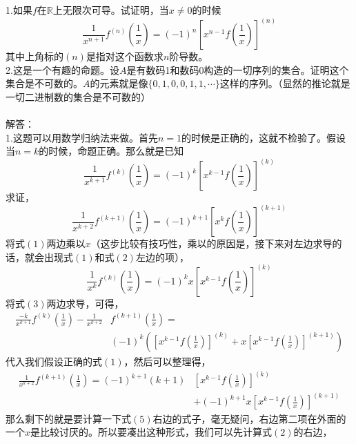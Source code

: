 \documentclass[11pt,a4paper,openany]{article} \usepackage{amssymb,amsfonts, amsmath,ctex,bm}
\begin{document}
\noindent 1.如果$f$在$\mathbb{R}$上无限次可导。试证明，当$x \neq 0$的时候
\[
\frac{1}{x^{n+1}}f^{(n)}\left(\frac{1}{x}\right)=(-1)^n\left[x^{n-1}f\left(\frac{1}{x}\right)\right]^{(n)}
\]
其中上角标的$(n)$是指对这个函数求$n$阶导数。\\
2.这是一个有趣的命题。设$A$是有数码1和数码0构造的一切序列的集合。证明这个集合是不可数的。$A$的元素就是像$\{0,1,0,0,1,1,\cdots\}$这样的序列。（显然的推论就是一切二进制数的集合是不可数的）\\
\\
解答：\\
1.这题可以用数学归纳法来做。首先$n=1$的时候是正确的，这就不检验了。假设当$n=k$的时候，命题正确。那么就是已知
\begin{equation}
\frac{1}{x^{k+1}}f^{(k)}\left(\frac{1}{x}\right)=(-1)^k\left[x^{k-1}f\left(\frac{1}{x}\right)\right]^{(k)}
\end{equation}
求证，
\begin{equation}
\frac{1}{x^{k+2}}f^{(k+1)}\left(\frac{1}{x}\right)=(-1)^{k+1}\left[x^{k}f\left(\frac{1}{x}\right)\right]^{(k+1)}
\end{equation}
将式$(1)$两边乘以$x$（这步比较有技巧性，乘以的原因是，接下来对左边求导的话，就会出现式$(1)$和式$(2)$左边的项），
\begin{equation}
\frac{1}{x^{k}}f^{(k)}\left(\frac{1}{x}\right)=(-1)^kx\left[x^{k-1}f\left(\frac{1}{x}\right)\right]^{(k)}
\end{equation}
将式$(3)$两边求导，可得，
\begin{equation}
\begin{split}
\frac{-k}{x^{k+1}}f^{(k)}\left(\frac{1}{x}\right)
-\frac{1}{x^{k+2}}&f^{(k+1)}\left(\frac{1}{x}\right)=\\
&(-1)^k\left(\left[x^{k-1}f\left(\frac{1}{x}\right)\right]^{(k)}+
x\left[x^{k-1}f\left(\frac{1}{x}\right)\right]^{(k+1)}\right)
\end{split}
\end{equation}
代入我们假设正确的式$(1)$，然后可以整理得，
\begin{equation}
\begin{split}
\frac{1}{x^{k+2}}f^{(k+1)}\left(\frac{1}{x}\right)
=
(-1)^{k+1}(k+1)&\left[x^{k-1}f\left(\frac{1}{x}\right)\right]^{(k)}\\
&+(-1)^{k+1}x\left[x^{k-1}f\left(\frac{1}{x}\right)\right]^{(k+1)}
\end{split}
\end{equation}
那么剩下的就是要计算一下式$(5)$右边的式子，毫无疑问，右边第二项在外面的一个$x$是比较讨厌的。所以要凑出这种形式，我们可以先计算$式(2)$的右边，
\end{document}
